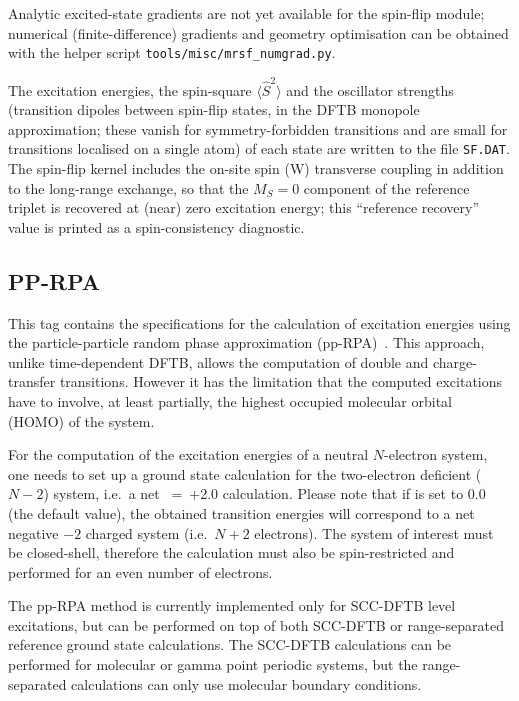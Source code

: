 Analytic excited-state gradients are not yet available for the spin-flip module;
numerical (finite-difference) gradients and geometry optimisation can be obtained
with the helper script \verb|tools/misc/mrsf_numgrad.py|.

The excitation energies, the spin-square $\langle \hat S^2\rangle$ and the
oscillator strengths (transition dipoles between spin-flip states, in the DFTB
monopole approximation; these vanish for symmetry-forbidden transitions and are
small for transitions localised on a single atom) of each state are written to
the file \verb|SF.DAT|. The spin-flip kernel includes the
on-site spin (W) transverse coupling in addition to the long-range exchange, so
that the $M_S=0$ component of the reference triplet is recovered at
(near) zero excitation energy; this ``reference recovery'' value is printed as a
spin-consistency diagnostic.

\subsection{PP-RPA}
\label{sec:dftbp.pprpa}

This tag contains the specifications for the calculation of excitation energies
using the particle-particle random phase approximation
(pp-RPA)~\cite{Yang2017}. This approach, unlike time-dependent DFTB, allows the
computation of double and charge-transfer transitions. However it has the
limitation that the computed excitations have to involve, at least partially,
the highest occupied molecular orbital (HOMO) of the system.

For the computation of the excitation energies of a neutral $N$-electron system,
one needs to set up a ground state calculation for the two-electron deficient
($N-2$) system, i.e.\ a net \mbox{ = +2.0} calculation. Please note
that if  is set to 0.0 (the default value), the obtained transition
energies will correspond to a net negative $-2$ charged system (i.e.\ $N+2$
electrons). The system of interest must be closed-shell, therefore the
calculation must also be spin-restricted and performed for an even number of
electrons.

The pp-RPA method is currently implemented only for SCC-DFTB level excitations,
but can be performed on top of both SCC-DFTB or range-separated reference ground
state calculations. The SCC-DFTB calculations can be performed for molecular or
gamma point periodic systems, but the range-separated calculations can only use
molecular boundary conditions.

